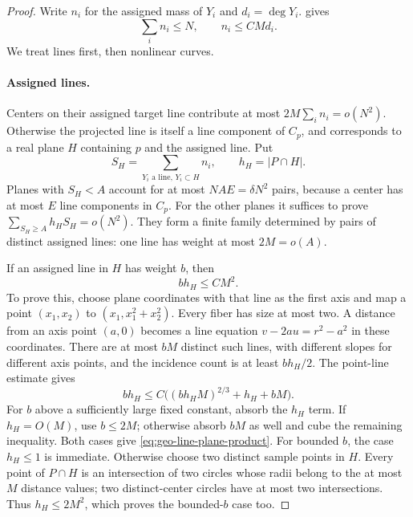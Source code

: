 \begin{proof}
Write $n_i$ for the assigned mass of $Y_i$ and $d_i=\deg Y_i$.  gives
\begin{equation}
 \sum_i n_i\le N,\qquad n_i\le C M d_i.
 \label{eq:geo-curve-mass}
\end{equation}
We treat lines first, then nonlinear curves.

\paragraph{Assigned lines.}
Centers on their assigned target line contribute at most $2M\sum_i n_i=o(N^2)$. Otherwise the projected line is itself a line component of $C_p$, and corresponds to a real plane $H$ containing $p$ and the assigned line. Put
\[
 S_H=\sum_{Y_i\text{ a line},\,Y_i\subset H}n_i,
 \qquad h_H=|P\cap H|.
\]
Planes with $S_H<A$ account for at most $NAE=\delta N^2$ pairs, because a center has at most $E$ line components in $C_p$. For the other planes it suffices to prove $\sum_{S_H\ge A}h_HS_H=o(N^2)$. They form a finite family determined by pairs of distinct assigned lines: one line has weight at most $2M=o(A)$.

If an assigned line in $H$ has weight $b$, then
\begin{equation}\label{eq:geo-line-plane-product}
 b h_H\le C M^2.
\end{equation}
To prove this, choose plane coordinates with that line as the first axis and map a point $(x_1,x_2)$ to $(x_1,x_1^2+x_2^2)$. Every fiber has size at most two. A distance from an axis point $(a,0)$ becomes a line equation $v-2au=r^2-a^2$ in these coordinates. There are at most $bM$ distinct such lines, with different slopes for different axis points, and the incidence count is at least $bh_H/2$. The point-line estimate gives
\[
 bh_H\le C\bigl((bh_HM)^{2/3}+h_H+bM\bigr).
\]
For $b$ above a sufficiently large fixed constant, absorb the $h_H$ term. If $h_H=O(M)$, use $b\le2M$; otherwise absorb $bM$ as well and cube the remaining inequality. Both cases give \eqref{eq:geo-line-plane-product}. For bounded $b$, the case $h_H\le1$ is immediate. Otherwise choose two distinct sample points in $H$. Every point of $P\cap H$ is an intersection of two circles whose radii belong to the at most $M$ distance values; two distinct-center circles have at most two intersections. Thus $h_H\le2M^2$, which proves the bounded-$b$ case too.


\end{proof}
